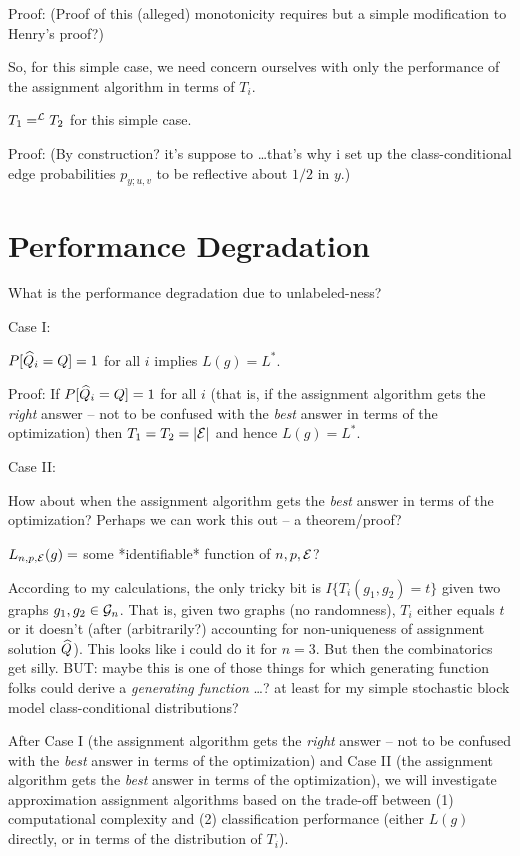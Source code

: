 Proof:
(Proof of this (alleged) monotonicity requires but a simple modification to Henry's proof?)

So, for this simple case,
we need concern ourselves with only the performance of the assignment algorithm in terms of $T_i$.

\thma
$T_1 =^{\mathcal{L}} T_2$ for this simple case.
\thmb

Proof:
(By construction? it's suppose to \dots that's why i set up the class-conditional edge probabilities
 $p_{y;u,v}$ to be reflective about $1/2$ in $y$.)




\section{Performance Degradation}

What is the performance degradation due to unlabeled-ness?

Case I:

\thma
$P[\widehat{Q}_i = Q]=1$ for all $i$ implies $L(g)=L^*$.
\thmb

Proof:
If $P[\widehat{Q}_i = Q]=1$ for all $i$
(that is, if the assignment algorithm gets the {\em right} answer --
not to be confused with the {\em best} answer
in terms of the optimization)
then $T_1=T_2=|\mathcal{E}|$ and hence $L(g)=L^*$.


Case II:

How about when the assignment algorithm gets the {\em best} answer
in terms of the optimization?
Perhaps we can work this out -- a theorem/proof?

\thma
$L_{n,p,\mathcal{E}}(g) =$ some *identifiable* function of $n,p,\mathcal{E}$?
\thmb

According to my calculations,
the only tricky bit is $I\{T_i(g_1,g_2) = t\}$
given two graphs $g_1,g_2 \in \mathcal{G}_n$.
That is, given two graphs (no randomness),
$T_i$ either equals $t$ or it doesn't
(after (arbitrarily?) accounting for non-uniqueness
of assignment solution $\widehat{Q}$).
This looks like i could do it for $n=3$.
But then the combinatorics get silly.
BUT: maybe this is one of those things for which
generating function folks
could derive a {\em generating function} \dots?
at least for my simple stochastic block model
class-conditional distributions?


After Case I
(the assignment algorithm gets the {\em right} answer --
not to be confused with the {\em best} answer in terms of the optimization)
and Case II
(the assignment algorithm gets the {\em best} answer in terms of the optimization),
we will investigate approximation assignment algorithms based on the trade-off between
(1) computational complexity and
(2) classification performance
(either $L(g)$ directly, or in terms of the distribution of $T_i$).


